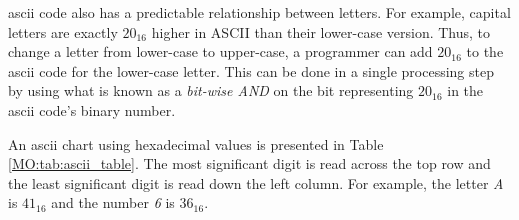 \gls{ascii} code also has a predictable relationship between letters. For example, capital letters are exactly $ 20_{16} $ higher in ASCII than their lower-case version. Thus, to change a letter from lower-case to upper-case, a programmer can add $ 20_{16} $ to the \gls{ascii} code for the lower-case letter. This can be done in a single processing step by using what is known as a \emph{bit-wise \textsf{AND}} on the bit representing $ 20_{16} $ in the \gls{ascii} code's binary number.

An \gls{ascii} chart using hexadecimal values is presented in Table \ref{MO:tab:ascii_table}. The most significant digit is read across the top row and the least significant digit is read down the left column. For example, the letter \emph{A} is $ 41_{16} $ and the number \emph{6} is $ 36_{16} $.

